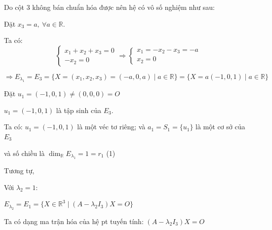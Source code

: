 \documentclass[12pt,a4paper]{article}
\newcommand{\R}{\mathbb{R}}
\begin{document}
Do cột 3 không bán chuẩn hóa được nên hệ có vô số nghiệm như sau:

Đặt $x_3=a,\ \forall a\in\R$.

Ta có:
\[
\begin{cases}x_1+x_2+x_3=0\\ -x_2=0\end{cases}
\Rightarrow
\begin{cases}x_1=-x_2-x_3=-a\\ x_2=0\end{cases}
\]

\[
\Rightarrow E_{\lambda_1}=E_3=\{X=(x_1,x_2,x_3)=(-a,0,a)\mid a\in\R\}=\{X=a(-1,0,1)\mid a\in\R\}
\]

Đặt $u_1=(-1,0,1)\neq(0,0,0)=O$

$u_1=(-1,0,1)$ là tập sinh của $E_3$.

Ta có: $u_1=(-1,0,1)$ là một véc tơ riêng; và $a_1=S_1=\{u_1\}$ là một cơ sở của $E_3$

và số chiều là $\dim_\R E_{\lambda_1}=1=r_1$ \hfill (1)

\medskip
Tương tự,

Với $\lambda_2=1$:

$E_{\lambda_2}=E_1=\{X\in\R^3 \mid (A-\lambda_2I_3)X=O\}$

Ta có dạng ma trận hóa của hệ pt tuyến tính: $(A-\lambda_2I_3)X=O$
\end{document}
